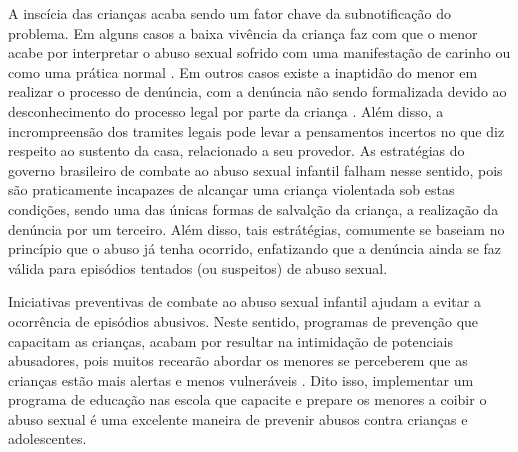A inscícia das crianças acaba sendo um fator chave da subnotificação do problema. Em alguns casos a baixa vivência da criança faz com que o menor acabe por interpretar o abuso sexual sofrido com uma manifestação de carinho ou como uma prática normal \cite{aded2006abuso}. Em outros casos existe a inaptidão do menor em realizar o processo de denúncia, com a denúncia não sendo formalizada devido ao desconhecimento do processo legal por parte da criança \cite{krug2002world}. Além disso, a incrompreensão dos tramites legais pode levar a pensamentos incertos no que diz respeito ao sustento da casa, relacionado a seu provedor. As estratégias do governo brasileiro de combate ao abuso sexual infantil falham nesse sentido, pois são praticamente incapazes de alcançar uma criança violentada sob estas condições, sendo uma das únicas formas de salvalção da criança, a realização da denúncia por um terceiro. Além disso, tais estrátégias, comumente se baseiam no princípio que o abuso já tenha ocorrido, enfatizando que a denúncia ainda se faz válida para episódios tentados (ou suspeitos) de abuso sexual.


Iniciativas preventivas de combate ao abuso sexual infantil ajudam a evitar a ocorrência de episódios abusivos. Neste sentido, programas de prevenção que capacitam as crianças, acabam por resultar na intimidação de potenciais abusadores, pois muitos recearão abordar os menores se perceberem que as crianças estão mais alertas e menos vulneráveis \cite{maria2010papel}. Dito isso, implementar um programa de educação nas escola que capacite e prepare os menores a coibir o abuso sexual é uma excelente maneira de prevenir abusos contra crianças e adolescentes.%





